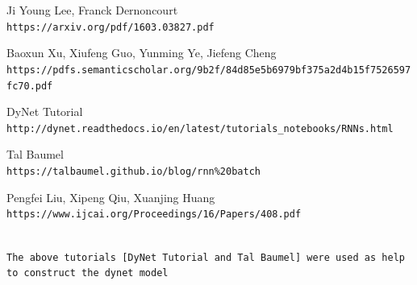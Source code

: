 \documentclass[twoside,twocolumn]{article}
\begin{document}

\begin{thebibliography}{99} %

Ji Young Lee, Franck Dernoncourt
\\\texttt{https://arxiv.org/pdf/1603.03827.pdf}

Baoxun Xu, Xiufeng Guo, Yunming Ye, Jiefeng Cheng
\\\texttt{https://pdfs.semanticscholar.org/9b2f/84d85e5b6979bf375a2d4b15f7526597fc70.pdf}

DyNet Tutorial
\\\texttt{http://dynet.readthedocs.io/en/latest/tutorials_notebooks/RNNs.html}

Tal Baumel
\\\texttt{https://talbaumel.github.io/blog/rnn\%20batch}

Pengfei Liu, Xipeng Qiu, Xuanjing Huang
\\\texttt{https://www.ijcai.org/Proceedings/16/Papers/408.pdf}

\end{thebibliography}

\\\texttt{The above tutorials [DyNet Tutorial and Tal Baumel] were used as help to construct the dynet model}
   
\end{document}
